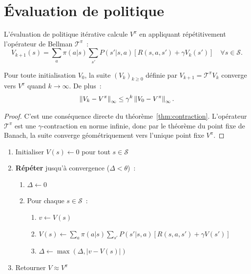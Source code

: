 \section{\'Evaluation de politique}

\begin{definition}
L'\'evaluation de politique it\'erative calcule $V^\pi$ en appliquant r\'ep\'etitivement
l'op\'erateur de Bellman $\mathcal{T}^\pi$~:
\[
    V_{k+1}(s) = \sum_{a} \pi(a|s) \sum_{s'} P(s'|s,a)[R(s,a,s') + \gamma V_k(s')]
    \quad \forall s \in \mathcal{S}.
\]
\end{definition}

\begin{theoreme}
\label{thm:conv_eval}
Pour toute initialisation $V_0$, la suite $(V_k)_{k \geq 0}$ d\'efinie par
$V_{k+1} = \mathcal{T}^\pi V_k$ converge vers $V^\pi$ quand $k \to \infty$.
De plus~:
\[
    \left\| V_k - V^\pi \right\|_\infty \leq \gamma^k \left\| V_0 - V^\pi \right\|_\infty.
\]
\end{theoreme}

\begin{proof}
C'est une cons\'equence directe du th\'eor\`eme~\ref{thm:contraction}. L'op\'erateur
$\mathcal{T}^\pi$ est une $\gamma$-contraction en norme infinie, donc par le
th\'eor\`eme du point fixe de Banach, la suite converge g\'eom\'etriquement
vers l'unique point fixe $V^\pi$.
\end{proof}

\begin{algorithme}[title=\textbf{\'Evaluation de politique it\'erative}]
\begin{enumerate}
    \item Initialiser $V(s) \leftarrow 0$ pour tout $s \in \mathcal{S}$
    \item \textbf{R\'ep\'eter} jusqu'\`a convergence ($\Delta < \theta$)~:
    \begin{enumerate}
        \item $\Delta \leftarrow 0$
        \item Pour chaque $s \in \mathcal{S}$~:
        \begin{enumerate}
            \item $v \leftarrow V(s)$
            \item $V(s) \leftarrow \sum_a \pi(a|s) \sum_{s'} P(s'|s,a)[R(s,a,s') + \gamma V(s')]$
            \item $\Delta \leftarrow \max(\Delta, |v - V(s)|)$
        \end{enumerate}
    \end{enumerate}
    \item Retourner $V \approx V^\pi$
\end{enumerate}
\end{algorithme}

